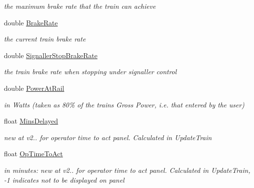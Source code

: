 \begin{DoxyCompactItemize}
\begin{DoxyCompactList}\small\item\em the maximum brake rate that the train can achieve \end{DoxyCompactList}\item 
\mbox{\label{class_t_train_afc10d4584267d8f4f05e9faa0a633a6e}} 
double \mbox{\hyperlink{class_t_train_afc10d4584267d8f4f05e9faa0a633a6e}{Brake\+Rate}}
\begin{DoxyCompactList}\small\item\em the current train brake rate \end{DoxyCompactList}\item 
\mbox{\label{class_t_train_a449a378257b8b3a3a2b3df40d0cca928}} 
double \mbox{\hyperlink{class_t_train_a449a378257b8b3a3a2b3df40d0cca928}{Signaller\+Stop\+Brake\+Rate}}
\begin{DoxyCompactList}\small\item\em the train brake rate when stopping under signaller control \end{DoxyCompactList}\item 
\mbox{\label{class_t_train_a6940d3fe404390d1d345a80bde3f6bf9}} 
double \mbox{\hyperlink{class_t_train_a6940d3fe404390d1d345a80bde3f6bf9}{Power\+At\+Rail}}
\begin{DoxyCompactList}\small\item\em in Watts (taken as 80\% of the train\textquotesingle{}s Gross Power, i.\+e. that entered by the user) \end{DoxyCompactList}\item 
\mbox{\label{class_t_train_ab1d46932f9ed9e6d0a3ee2f3e76d1705}} 
float \mbox{\hyperlink{class_t_train_ab1d46932f9ed9e6d0a3ee2f3e76d1705}{Mins\+Delayed}}
\begin{DoxyCompactList}\small\item\em new at v2.. for operator time to act panel. Calculated in Update\+Train \end{DoxyCompactList}\item 
\mbox{\label{class_t_train_a324320d17dcf544cb0507b909ac14975}} 
float \mbox{\hyperlink{class_t_train_a324320d17dcf544cb0507b909ac14975}{Op\+Time\+To\+Act}}
\begin{DoxyCompactList}\small\item\em in minutes\+: new at v2.. for operator time to act panel. Calculated in Update\+Train, -\/1 indicates not to be displayed on panel \end{DoxyCompactList}\item 

\end{DoxyCompactItemize}
